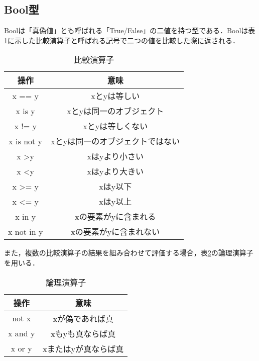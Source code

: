 \subsection{Bool型}
Boolは「真偽値」とも呼ばれる「True/False」の二値を持つ型である．Boolは表\ref{comparative_operator}に示した比較演算子と呼ばれる記号で二つの値を比較した際に返される．
\begin{table}[htbp]
 \centering
   \caption{比較演算子}
    \begin{tabular}{|c|c|} \hline
     操作 & 意味 \\ \hline \hline
     x == y & xとyは等しい \\ \hline
     x is y & xとyは同一のオブジェクト \\ \hline
     x != y & xとyは等しくない \\ \hline
     x is not y & xとyは同一のオブジェクトではない \\ \hline
     x \textgreater y & xはyより小さい \\ \hline
     x \textless y & xはyより大きい \\ \hline
     x \textgreater= y & xはy以下 \\ \hline
     x \textless= y & xはy以上 \\ \hline
     x in y & xの要素がyに含まれる \\ \hline
     x not in y & xの要素がyに含まれない \\ \hline
    \end{tabular}
   \label{comparative_operator}
\end{table}

また，複数の比較演算子の結果を組み合わせて評価する場合，表\ref{logical_operator}の論理演算子を用いる．
\begin{table}[htbp]
 \centering
  \caption{論理演算子}
   \begin{tabular}{|c|c|} \hline
   操作 & 意味 \\ \hline \hline
   not x & xが偽であれば真 \\ \hline
   x and y & xもyも真ならば真 \\ \hline
   x or y & xまたはyが真ならば真 \\ \hline
   \end{tabular}
  \label{logical_operator}
\end{table}


